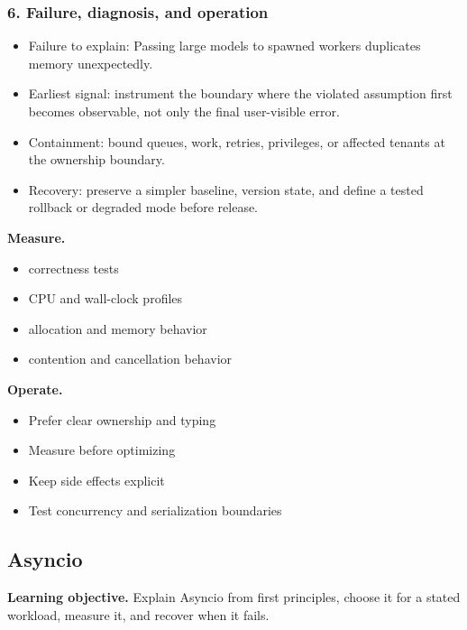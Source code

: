 \subsubsection*{6. Failure, diagnosis, and operation}
\begin{itemize}
\item Failure to explain: Passing large models to spawned workers duplicates memory unexpectedly.
\item Earliest signal: instrument the boundary where the violated assumption first becomes observable, not only the final user-visible error.
\item Containment: bound queues, work, retries, privileges, or affected tenants at the ownership boundary.
\item Recovery: preserve a simpler baseline, version state, and define a tested rollback or degraded mode before release.
\end{itemize}
\textbf{Measure.}\begin{itemize}
\item correctness tests
\item CPU and wall-clock profiles
\item allocation and memory behavior
\item contention and cancellation behavior
\end{itemize}
\textbf{Operate.}\begin{itemize}
\item Prefer clear ownership and typing
\item Measure before optimizing
\item Keep side effects explicit
\item Test concurrency and serialization boundaries
\end{itemize}
\subsection{Asyncio}
\textbf{Learning objective.} Explain Asyncio from first principles, choose it for a stated workload, measure it, and recover when it fails.
